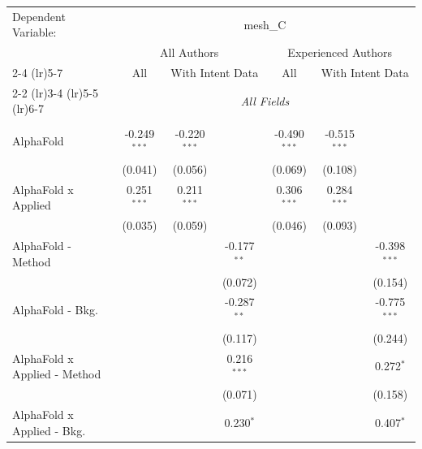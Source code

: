 \begingroup
\centering
\begin{tabular}{lcccccc}
   \tabularnewline \midrule \midrule
   Dependent Variable: & \multicolumn{6}{c}{mesh\_C}\\
 & \multicolumn{3}{c}{All Authors} & \multicolumn{3}{c}{Experienced Authors} \\
\cmidrule(lr){2-4} \cmidrule(lr){5-7}
 & \multicolumn{1}{c}{All} & \multicolumn{2}{c}{With Intent Data} & \multicolumn{1}{c}{All} & \multicolumn{2}{c}{With Intent Data} \\
\cmidrule(lr){2-2} \cmidrule(lr){3-4} \cmidrule(lr){5-5} \cmidrule(lr){6-7}
 & \multicolumn{6}{c}{\textit{All Fields}} \\ \\
   AlphaFold                      & -0.249$^{***}$ & -0.220$^{***}$ &               & -0.490$^{***}$ & -0.515$^{***}$ &   \\   
                                  & (0.041)        & (0.056)        &               & (0.069)        & (0.108)        &   \\   
   AlphaFold x Applied            & 0.251$^{***}$  & 0.211$^{***}$  &               & 0.306$^{***}$  & 0.284$^{***}$  &   \\   
                                  & (0.035)        & (0.059)        &               & (0.046)        & (0.093)        &   \\   
   AlphaFold - Method             &                &                & -0.177$^{**}$ &                &                & -0.398$^{***}$\\   
                                  &                &                & (0.072)       &                &                & (0.154)\\   
   AlphaFold - Bkg.               &                &                & -0.287$^{**}$ &                &                & -0.775$^{***}$\\   
                                  &                &                & (0.117)       &                &                & (0.244)\\   
   AlphaFold x Applied - Method   &                &                & 0.216$^{***}$ &                &                & 0.272$^{*}$\\   
                                  &                &                & (0.071)       &                &                & (0.158)\\   
   AlphaFold x Applied - Bkg.     &                &                & 0.230$^{*}$   &                &                & 0.407$^{*}$\\   

\end{tabular}
